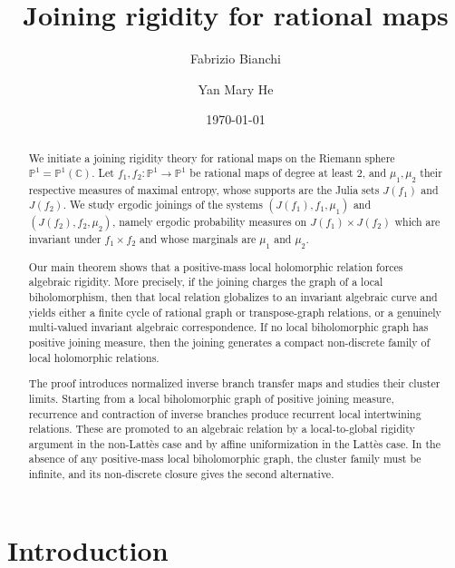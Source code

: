 \documentclass[11pt]{amsart}
\title{Joining rigidity for rational maps}
\author{Fabrizio Bianchi}
\author{Yan Mary He}
\date{\today}
\numberwithin{equation}{section}
\theoremstyle{plain}
\theoremstyle{definition}
\theoremstyle{remark}
\begin{document}
\begin{abstract}
We initiate a joining rigidity theory for rational maps on the Riemann
sphere $\mathbb P^1=\mathbb P^1(\mathbb C)$. Let
$f_1,f_2\colon\mathbb P^1\to\mathbb P^1$ be rational maps of degree
at least $2$,
and 
$\mu_1,\mu_2$
their respective measures of
maximal entropy, whose supports are the Julia sets $J(f_1)$ and
$J(f_2)$. We study ergodic joinings of the systems
$(J(f_1),f_1,\mu_1)$ and $(J(f_2),f_2,\mu_2)$, namely ergodic
probability measures on $J(f_1)\times J(f_2)$ which are invariant
under $f_1\times f_2$ and whose marginals are $\mu_1$ and $\mu_2$.

Our main theorem shows that a positive-mass local holomorphic relation
forces algebraic rigidity. More precisely, if the joining charges the
graph of a local biholomorphism, then that local relation globalizes to
an invariant algebraic curve and yields either a finite cycle of rational
graph or transpose-graph relations, or a genuinely multi-valued
invariant algebraic correspondence. If no local biholomorphic graph has
positive joining measure, then the joining generates a compact
non-discrete family of local holomorphic relations.

The proof introduces normalized inverse branch transfer maps and studies
their cluster limits. Starting from a local biholomorphic graph of
positive joining measure, recurrence and contraction of inverse branches
produce recurrent local intertwining relations. These are promoted to an algebraic relation by a local-to-global
rigidity argument in the non-Latt\`es case and by affine
uniformization in the Latt\`es case. In the absence of
any positive-mass local biholomorphic graph, the cluster family must be
infinite, and its non-discrete closure gives the second alternative.
\end{abstract}


\maketitle


\section{Introduction}
\end{document}
